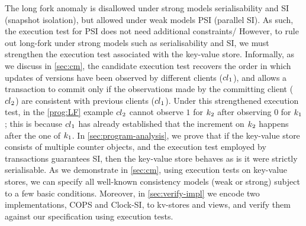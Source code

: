 The long fork anomaly is disallowed under strong models \eg serialisability and SI (snapshot isolation), 
but allowed under weak models \eg PSI (parallel SI). 
As such, the execution test for PSI does not need additional constraints/ 
However, to rule out long-fork under strong models such as serialisability and SI, 
we must strengthen the execution test associated with the key-value store.
Informally, as we discuss in \cref{sec:cm}, the candidate execution test recovers the order in which 
updates of versions have been observed by different clients (\eg ${cl}_1$), 
and allows a transaction to commit only if the observations made by the committing client (\eg ${cl}_2$) 
are consistent with previous clients (\ie ${cl}_1$). 
Under this strengthened execution test, in the \eqref{prog:LF} example ${cl}_2$ cannot
observe $1$ for $k_2$ after observing $0$ for $k_1$; 
this is because ${cl}_1$ has already established that the increment on $k_2$ happens after 
the one of $k_1$. 
In \cref{sec:program-analysis}, we prove that if the key-value store consists of multiple counter objects, and the execution test employed by transactions guarantees SI, then the key-value store behaves as is it were strictly serialisable.
%
As we demonstrate in \cref{sec:cm}, using execution tests on key-value stores, we can specify all well-known consistency models (weak or strong) subject to a few basic conditions. 
%
Moreover, in \cref{sec:verify-impl} we encode two implementations, COPS and Clock-SI, to kv-stores and views,
and verify them against our specification using execution tests.


